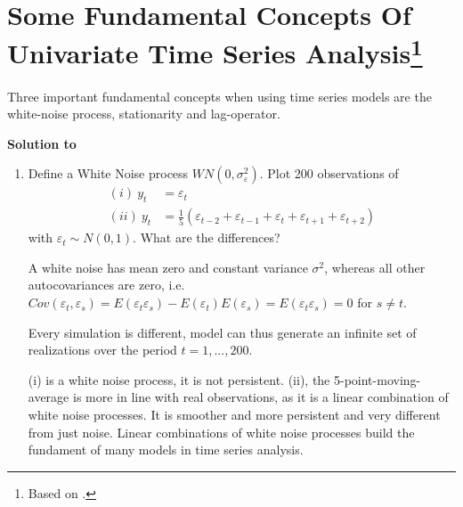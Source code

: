 \documentclass[a4paper]{scrartcl}
\begin{document}
    \section[Some Fundamental Concepts Of Univariate Time Series Analysis]{Some Fundamental Concepts Of Univariate Time Series Analysis\footnote{Based on \citet[Ch.~2]{BjornlandThorsrud.2015}.}}\label{ex:FundamentalConceptsUnivariateTSA}
    Three important fundamental concepts when using time series models are the white-noise process, stationarity and lag-operator.
    \begin{solution}\textbf{Solution to }
    \end{solution}
    
    \begin{enumerate}
        \item Define a White Noise process $WN(0,\sigma_\varepsilon^2)$. Plot 200 observations of
              \begin{align*} (i)~y_t & =\varepsilon_t \\ (ii)~y_t &= \frac{1}{5}(\varepsilon_{t-2}+\varepsilon_{t-1}+\varepsilon_{t}+\varepsilon_{t+1}+\varepsilon_{t+2})
              \end{align*} with $\varepsilon_{t} \sim N(0,1)$. What are the differences?
              \begin{solution}
                  A white noise has mean zero and constant variance $\sigma^2$, whereas all other autocovariances are zero, i.e. $Cov(\varepsilon_{t},\varepsilon_s) = E(\varepsilon_t \varepsilon_s) - E(\varepsilon_t)E(\varepsilon_s) = E(\varepsilon_t \varepsilon_s) = 0$ for $s \neq t$.		
                  
                  Every simulation is different, model can thus generate an infinite set of realizations over the period $t=1,...,200$. 
                  
                  (i) is a white noise process, it is not persistent.		
                  (ii), the 5-point-moving-average is more in line with real observations, as it is a linear combination of white noise processes. It is smoother and more persistent and very different from just noise. Linear combinations of white noise processes build the fundament of many models in time series analysis.
              \end{solution}
              

\end{enumerate}
\end{document}
